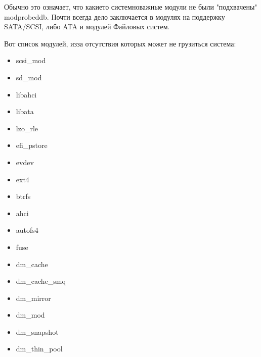 \documentclass[letterpaper,10pt,russian,openany]{sphinxmanual}
\begin{document}
\sphinxAtStartPar
{} Обычно это означает, что какие\sphinxhyphen{}то системно\sphinxhyphen{}важные модули не были "подхвачены" modprobed\sphinxhyphen{}db.
Почти всегда дело заключается в модулях на поддержку SATA/SCSI, либо ATA и модулей Файловых систем.

\sphinxAtStartPar
Вот список модулей, из\sphinxhyphen{}за отсутствия которых может не грузиться система:
\begin{itemize}
\item {} 
\sphinxAtStartPar
scsi\_mod

\item {} 
\sphinxAtStartPar
sd\_mod

\item {} 
\sphinxAtStartPar
libahci

\item {} 
\sphinxAtStartPar
libata

\item {} 
\sphinxAtStartPar
lzo\_rle

\item {} 
\sphinxAtStartPar
efi\_pstore

\item {} 
\sphinxAtStartPar
evdev

\item {} 
\sphinxAtStartPar
ext4

\item {} 
\sphinxAtStartPar
btrfs

\item {} 
\sphinxAtStartPar
ahci

\item {} 
\sphinxAtStartPar
autofs4

\item {} 
\sphinxAtStartPar
fuse

\item {} 
\sphinxAtStartPar
dm\_cache

\item {} 
\sphinxAtStartPar
dm\_cache\_smq

\item {} 
\sphinxAtStartPar
dm\_mirror

\item {} 
\sphinxAtStartPar
dm\_mod

\item {} 
\sphinxAtStartPar
dm\_snapshot

\item {} 
\sphinxAtStartPar
dm\_thin\_pool

\end{itemize}
\end{document}
